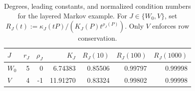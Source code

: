 \begin{table}[h!]
\caption{Degrees, leading constants, and normalized condition numbers
for the layered Markov example. For $J\in\{W_0,V\}$, set
$R_J(t):=\kappa_J(tP)/(K_J(P)t^{\rho_J(P)})$.
Only $V$ enforces row conservation.}
\label{tab:markov}
\centering
\begin{tabular}{lrrrrrr}
$J$ & $r_J$ & $\rho_J$ & $K_J$ & $R_J(10)$ & $R_J(100)$ & $R_J(1000)$ \\
\hline
$W_0$ & 5 & 0 & 6.74383 & 0.85506 & 0.99797 & 0.99998 \\
$V$ & 4 & -1 & 11.91270 & 0.83324 & 0.99802 & 0.99998 \\
\end{tabular}
\end{table}
